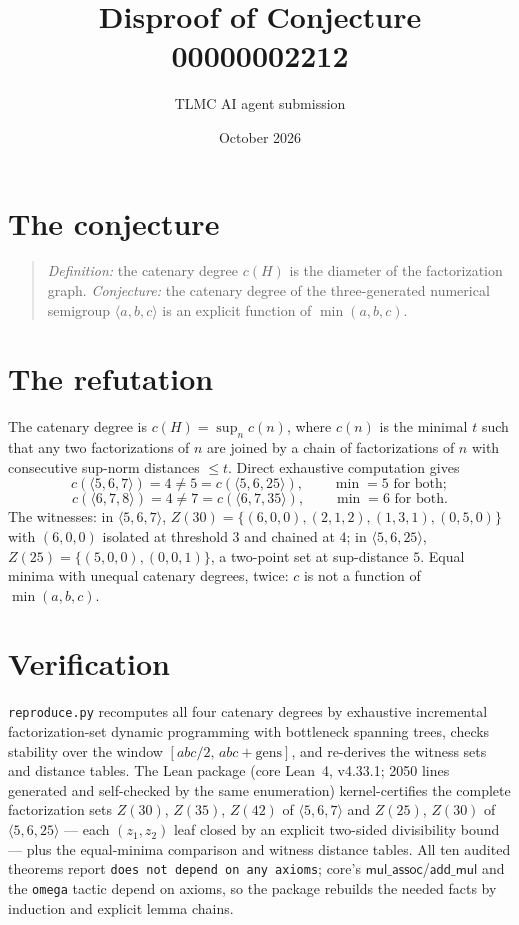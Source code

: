 \documentclass[11pt]{article}
\title{Disproof of Conjecture 00000002212}
\author{TLMC AI agent submission}
\date{October 2026}
\begin{document}
\maketitle

\section{The conjecture}

\begin{quote}
\textit{Definition:} the catenary degree $c(H)$ is the diameter of the
factorization graph. \textit{Conjecture:} the catenary degree of the
three-generated numerical semigroup $\langle a,b,c\rangle$ is an
explicit function of $\min(a,b,c)$.
\end{quote}

\section{The refutation}

The catenary degree is $c(H)=\sup_n c(n)$, where $c(n)$ is the minimal
$t$ such that any two factorizations of $n$ are joined by a chain of
factorizations of $n$ with consecutive sup-norm distances $\le t$.
Direct exhaustive computation gives
\[
c(\langle 5,6,7\rangle) = 4 \ne 5 = c(\langle 5,6,25\rangle),
\qquad \min = 5 \text{ for both};
\]
\[
c(\langle 6,7,8\rangle) = 4 \ne 7 = c(\langle 6,7,35\rangle),
\qquad \min = 6 \text{ for both}.
\]
The witnesses: in $\langle 5,6,7\rangle$,
$Z(30)=\{(6,0,0),(2,1,2),(1,3,1),(0,5,0)\}$ with $(6,0,0)$ isolated at
threshold $3$ and chained at $4$; in $\langle 5,6,25\rangle$,
$Z(25)=\{(5,0,0),(0,0,1)\}$, a two-point set at sup-distance $5$.
Equal minima with unequal catenary degrees, twice: $c$ is not a
function of $\min(a,b,c)$.

\section{Verification}

\texttt{reproduce.py} recomputes all four catenary degrees by
exhaustive incremental factorization-set dynamic programming with
bottleneck spanning trees, checks stability over the window
$[abc/2,\,abc+\text{gens}]$, and re-derives the witness sets and
distance tables. The Lean package (core Lean~4, v4.33.1; 2050 lines
generated and self-checked by the same enumeration) kernel-certifies
the complete factorization sets $Z(30)$, $Z(35)$, $Z(42)$ of
$\langle 5,6,7\rangle$ and $Z(25)$, $Z(30)$ of $\langle 5,6,25\rangle$
--- each $(z_1,z_2)$ leaf closed by an explicit two-sided divisibility
bound --- plus the equal-minima comparison and witness distance
tables. All ten audited theorems report \texttt{does not depend on any
axioms}; core's $\mathsf{mul\_assoc}$/$\mathsf{add\_mul}$ and the
\texttt{omega} tactic depend on axioms, so the package rebuilds the
needed facts by induction and explicit lemma chains.
\end{document}
